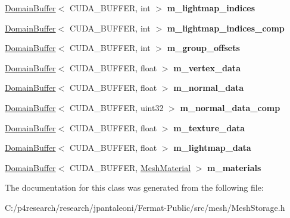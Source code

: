 \begin{DoxyCompactItemize}
\item 
\mbox{\label{class_device_mesh_storage_a07aeb81d730fbaff3f2400486ee8ab51}} 
\hyperlink{class_domain_buffer}{Domain\+Buffer}$<$ C\+U\+D\+A\+\_\+\+B\+U\+F\+F\+ER, int $>$ {\bfseries m\+\_\+lightmap\+\_\+indices}
\item 
\mbox{\label{class_device_mesh_storage_ad29ad0dc19dff6f0621404d7e02e31c3}} 
\hyperlink{class_domain_buffer}{Domain\+Buffer}$<$ C\+U\+D\+A\+\_\+\+B\+U\+F\+F\+ER, int $>$ {\bfseries m\+\_\+lightmap\+\_\+indices\+\_\+comp}
\item 
\mbox{\label{class_device_mesh_storage_ad9cc7b55238244e49c3f9e9aeda79e52}} 
\hyperlink{class_domain_buffer}{Domain\+Buffer}$<$ C\+U\+D\+A\+\_\+\+B\+U\+F\+F\+ER, int $>$ {\bfseries m\+\_\+group\+\_\+offsets}
\item 
\mbox{\label{class_device_mesh_storage_af23dc55b297be2a6f446519f4a4a7f7e}} 
\hyperlink{class_domain_buffer}{Domain\+Buffer}$<$ C\+U\+D\+A\+\_\+\+B\+U\+F\+F\+ER, float $>$ {\bfseries m\+\_\+vertex\+\_\+data}
\item 
\mbox{\label{class_device_mesh_storage_aa9b07c98ab2fdc07b2402898e81bc27f}} 
\hyperlink{class_domain_buffer}{Domain\+Buffer}$<$ C\+U\+D\+A\+\_\+\+B\+U\+F\+F\+ER, float $>$ {\bfseries m\+\_\+normal\+\_\+data}
\item 
\mbox{\label{class_device_mesh_storage_a3ec75d5db93c98580f7337cde9dff56f}} 
\hyperlink{class_domain_buffer}{Domain\+Buffer}$<$ C\+U\+D\+A\+\_\+\+B\+U\+F\+F\+ER, uint32 $>$ {\bfseries m\+\_\+normal\+\_\+data\+\_\+comp}
\item 
\mbox{\label{class_device_mesh_storage_accca2e64f5d363bc23589953d8c5c10e}} 
\hyperlink{class_domain_buffer}{Domain\+Buffer}$<$ C\+U\+D\+A\+\_\+\+B\+U\+F\+F\+ER, float $>$ {\bfseries m\+\_\+texture\+\_\+data}
\item 
\mbox{\label{class_device_mesh_storage_a1acd6c7282fbf66bb1e85b5a04a526e3}} 
\hyperlink{class_domain_buffer}{Domain\+Buffer}$<$ C\+U\+D\+A\+\_\+\+B\+U\+F\+F\+ER, float $>$ {\bfseries m\+\_\+lightmap\+\_\+data}
\item 
\mbox{\label{class_device_mesh_storage_a5783dc3cb26f35aefb65277b2b8ea04b}} 
\hyperlink{class_domain_buffer}{Domain\+Buffer}$<$ C\+U\+D\+A\+\_\+\+B\+U\+F\+F\+ER, \hyperlink{struct_mesh_material}{Mesh\+Material} $>$ {\bfseries m\+\_\+materials}
\end{DoxyCompactItemize}


The documentation for this class was generated from the following file\+:\begin{DoxyCompactItemize}
\item 
C\+:/p4research/research/jpantaleoni/\+Fermat-\/\+Public/src/mesh/Mesh\+Storage.\+h\end{DoxyCompactItemize}
